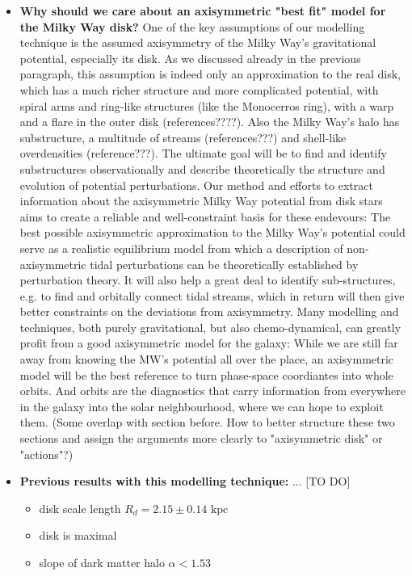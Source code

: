 \begin{itemize}
\item \textbf{Why should we care about an axisymmetric "best fit" model for the Milky Way disk?} One of the key assumptions of our modelling technique is the assumed axisymmetry of the Milky Way's gravitational potential, especially its disk. As we discussed already in the previous paragraph, this assumption is indeed only an approximation to the real disk, which has a much richer structure and more complicated potential, with spiral arms and ring-like structures (like the Monocerros ring), with a warp and a flare in the outer disk (references????). Also the Milky Way's halo has substructure, a multitude of streams (references???) and shell-like overdensities (reference???). The ultimate goal will be to find and identify substructures observationally and describe theoretically the structure and evolution of potential perturbations. Our method and efforts  to extract information about the axisymmetric Milky Way potential from disk stars aims to create a reliable and well-constraint basis for these endevours: The best possible axisymmetric approximation to the Milky Way's potential could serve as a realistic equilibrium model from which a description of non-axisymmetric tidal perturbations can be theoretically established by perturbation theory. It will also help a great deal to identify sub-structures, e.g. to find and orbitally connect tidal streams, which in return will then give better constraints on the deviations from axisymmetry. Many modelling and techniques, both purely gravitational, but also chemo-dynamical, can greatly profit from a good axisymmetric model for the galaxy: While we are still far away from knowing the MW's potential all over the place, an axisymmetric model will be the best reference to turn phase-space coordiantes into whole orbits. And orbits are the diagnostics that carry information from everywhere in the galaxy into the solar neighbourhood, where we can hope to exploit them. (Some overlap with section before. How to better structure these two sections and assign the arguments more clearly to "axisymmetric disk" or "actions"?) 

\item \textbf{Previous results with this modelling technique:} \citet{bov13} ... [TO DO]
\begin{itemize}
\item disk scale length $R_d = 2.15 \pm 0.14 \text{ kpc }$ \citep{bov13}
\item disk is maximal \citep{bov13}
\item slope of dark matter halo $\alpha < 1.53$ \citep{bov13}
\end{itemize}


\end{itemize}
